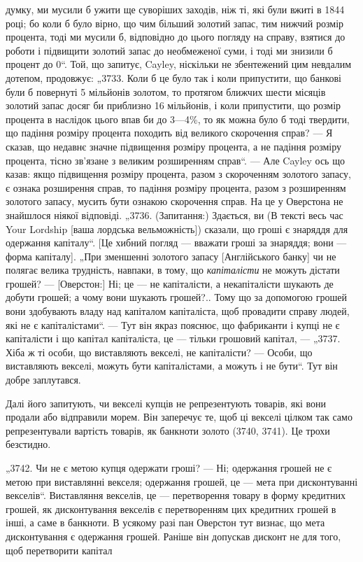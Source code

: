 \parcont{}  %
думку, ми мусили б ужити ще суворіших заходів, ніж ті, які
були вжиті в 1844 році; бо коли б було вірно, що чим більший
золотий запас, тим нижчий розмір процента, тоді ми мусили б,
відповідно до цього погляду на справу, взятися до роботи і підвищити золотий запас до необмеженої
суми, і тоді ми знизили б
процент до 0“. Той, що запитує, Cayley, ніскільки не збентежений цим невдалим дотепом, продовжує:
„3733. Коли б це
було так і коли припустити, що банкові були б повернуті
5 мільйонів золотом, то протягом ближчих шести місяців золотий запас досяг би приблизно 16
мільйонів, і коли припустити,
що розмір процента в наслідок цього впав би до 3—4\%, то
як можна було б тоді твердити, що падіння розміру процента
походить від великого скорочення справ? — Я сказав, що недавнє значне підвищення розміру процента, а
не падіння розміру
процента, тісно зв’язане з великим розширенням справ“. — Але
Cayley ось що казав: якщо підвищення розміру процента, разом з скороченням золотого запасу, є ознака
розширення справ,
то падіння розміру процента, разом з розширенням золотого
запасу, мусить бути ознакою скорочення справ. На це у
Оверстона не знайшлося ніякої відповіді. „3736. (Запитання:)
Здається, ви (В тексті весь час Your Lordship [ваша лордська
вельможність]) сказали, що гроші є знаряддя для одержання
капіталу“. [Це хибний погляд — вважати гроші за знаряддя; вони — форма капіталу]. „При зменшенні
золотого запасу [Англійського банку] чи не полягає велика трудність, навпаки, в тому,
що \emph{капіталісти} не можуть дістати грошей? — [Оверстон:]
Ні; це — не капіталісти, а некапіталісти шукають де добути
грошей; а чому вони шукають грошей?.. Тому що за допомогою
грошей вони здобувають владу над капіталом капіталіста, щоб
провадити справу людей, які не є капіталістами“. — Тут він
якраз пояснює, що фабриканти і купці не є капіталісти і що
капітал капіталіста, це — тільки грошовий капітал, — „3737. Хіба ж
ті особи, що виставляють векселі, не капіталісти? — Особи,
що виставляють векселі, можуть бути капіталістами, а можуть
і не бути“. Тут він добре заплутався.

Далі його запитують, чи векселі купців не репрезентують
товарів, які вони продали або відправили морем. Він заперечує те, щоб ці векселі цілком так само
репрезентували
вартість товарів, як банкноти золото (3740, 3741). Це трохи
безстидно.

„3742. Чи не є метою купця одержати гроші? — Ні; одержання грошей не є метою при виставлянні
векселя; одержання
грошей, це — мета при дисконтуванні векселів“. Виставляння
векселів, це — перетворення товару в форму кредитних грошей,
як дисконтування векселів є перетворенням цих кредитних грошей в інші, а саме в банкноти. В усякому
разі пан Оверстон тут
визнає, що мета дисконтування є одержання грошей. Раніше
він допускав дисконт не для того, щоб перетворити капітал
\parbreak{}  %
